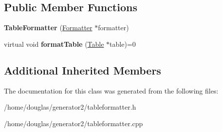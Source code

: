 \subsection*{Public Member Functions}
\begin{DoxyCompactItemize}
\item 
{\bfseries Table\+Formatter} (\hyperlink{classFormatter}{Formatter} $\ast$formatter)\hypertarget{classTableFormatter_a7bd88106f0ecdd30198dcdf400ee1292}{}\label{classTableFormatter_a7bd88106f0ecdd30198dcdf400ee1292}

\item 
virtual void {\bfseries format\+Table} (\hyperlink{classTable}{Table} $\ast$table)=0\hypertarget{classTableFormatter_ac91863d9905a4b97a09b042ba0196d99}{}\label{classTableFormatter_ac91863d9905a4b97a09b042ba0196d99}

\end{DoxyCompactItemize}
\subsection*{Additional Inherited Members}


The documentation for this class was generated from the following files\+:\begin{DoxyCompactItemize}
\item 
/home/douglas/generator2/tableformatter.\+h\item 
/home/douglas/generator2/tableformatter.\+cpp\end{DoxyCompactItemize}
